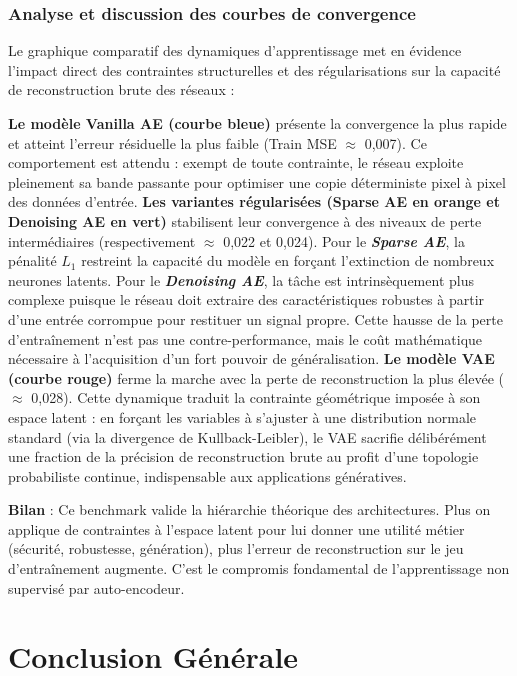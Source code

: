 \documentclass[11pt,a4paper]{report}
\begin{document}
\subsubsection{Analyse et discussion des courbes de convergence}

Le graphique comparatif des dynamiques d’apprentissage met en évidence l'impact direct des contraintes structurelles et des régularisations sur la capacité de reconstruction brute des réseaux :

\textbf{Le modèle Vanilla AE (courbe bleue)} présente la convergence la plus rapide et atteint l'erreur résiduelle la plus faible (Train MSE $\approx$ 0,007). Ce comportement est attendu : exempt de toute contrainte, le réseau exploite pleinement sa bande passante pour optimiser une copie déterministe pixel à pixel des données d'entrée.
\textbf{Les variantes régularisées (Sparse AE en orange et Denoising AE en vert)} stabilisent leur convergence à des niveaux de perte intermédiaires (respectivement $\approx$ 0,022 et 0,024). Pour le \textbf{\textit{Sparse AE}}, la pénalité $L_1$ restreint la capacité du modèle en forçant l'extinction de nombreux neurones latents. Pour le \textbf{\textit{Denoising AE}}, la tâche est intrinsèquement plus complexe puisque le réseau doit extraire des caractéristiques robustes à partir d'une entrée corrompue pour restituer un signal propre. Cette hausse de la perte d'entraînement n'est pas une contre-performance, mais le coût mathématique nécessaire à l'acquisition d'un fort pouvoir de généralisation.
\textbf{Le modèle VAE (courbe rouge)} ferme la marche avec la perte de reconstruction la plus élevée ($\approx$ 0,028). Cette dynamique traduit la contrainte géométrique imposée à son espace latent : en forçant les variables à s'ajuster à une distribution normale standard (via la divergence de Kullback-Leibler), le VAE sacrifie délibérément une fraction de la précision de reconstruction brute au profit d'une topologie probabiliste continue, indispensable aux applications génératives.

\textbf{Bilan} : Ce benchmark valide la hiérarchie théorique des architectures. Plus on applique de contraintes à l'espace latent pour lui donner une utilité métier (sécurité, robustesse, génération), plus l'erreur de reconstruction sur le jeu d'entraînement augmente. C'est le compromis fondamental de l'apprentissage non supervisé par auto-encodeur.

\section{Conclusion Générale}
\label{sec:conclusion_generale}
\end{document}
